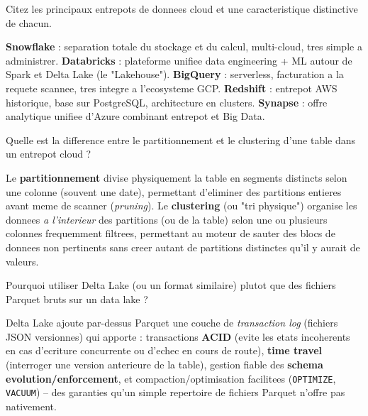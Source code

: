 \documentclass[11pt,a4paper]{article}
\begin{document}
\begin{question} Citez les principaux entrepots de donnees cloud et une caracteristique distinctive de chacun.
\end{question}
\begin{reponse}
\textbf{Snowflake} : separation totale du stockage et du calcul, multi-cloud, tres simple a administrer. \textbf{Databricks} : plateforme unifiee data engineering + ML autour de Spark et Delta Lake (le "Lakehouse"). \textbf{BigQuery} : serverless, facturation a la requete scannee, tres integre a l'ecosysteme GCP. \textbf{Redshift} : entrepot AWS historique, base sur PostgreSQL, architecture en clusters. \textbf{Synapse} : offre analytique unifiee d'Azure combinant entrepot et Big Data.
\end{reponse}

\begin{question} Quelle est la difference entre le partitionnement et le clustering d'une table dans un entrepot cloud ?
\end{question}
\begin{reponse}
Le \textbf{partitionnement} divise physiquement la table en segments distincts selon une colonne (souvent une date), permettant d'eliminer des partitions entieres avant meme de scanner (\emph{pruning}). Le \textbf{clustering} (ou "tri physique") organise les donnees \emph{a l'interieur} des partitions (ou de la table) selon une ou plusieurs colonnes frequemment filtrees, permettant au moteur de sauter des blocs de donnees non pertinents sans creer autant de partitions distinctes qu'il y aurait de valeurs.
\end{reponse}

\begin{question} Pourquoi utiliser Delta Lake (ou un format similaire) plutot que des fichiers Parquet bruts sur un data lake ?
\end{question}
\begin{reponse}
Delta Lake ajoute par-dessus Parquet une couche de \emph{transaction log} (fichiers JSON versionnes) qui apporte : transactions \textbf{ACID} (evite les etats incoherents en cas d'ecriture concurrente ou d'echec en cours de route), \textbf{time travel} (interroger une version anterieure de la table), gestion fiable des \textbf{schema evolution/enforcement}, et compaction/optimisation facilitees (\texttt{OPTIMIZE}, \texttt{VACUUM}) -- des garanties qu'un simple repertoire de fichiers Parquet n'offre pas nativement.
\end{reponse}
\end{document}
